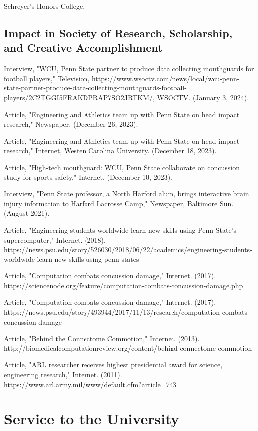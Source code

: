 \documentclass[a4paper,10pt]{article}
\begin{document}
Schreyer's Honors College.
\subsection*{Impact in Society of Research, Scholarship, and Creative Accomplishment}
\noindent
Interview, "WCU, Penn State partner to produce data collecting mouthguards for football players," Television, https://www.wsoctv.com/news/local/wcu-penn-state-partner-produce-data-collecting-mouthguards-football-players/2C2TGGI5FRAKDPRAP7SO2JRTKM/, WSOCTV. (January 3, 2024).

Article, "Engineering and Athletics team up with Penn State on head impact research," Newspaper. (December 26, 2023).

Article, "Engineering and Athletics team up with Penn State on head impact research," Internet, Westen Carolina University. (December 18, 2023).

Article, "High-tech mouthguard: WCU, Penn State collaborate on concussion study for sports safety," Internet. (December 10, 2023).

Interview, "Penn State professor, a North Harford alum, brings interactive brain injury information to Harford Lacrosse Camp," Newspaper, Baltimore Sun. (August 2021).

Article, "Engineering students worldwide learn new skills using Penn State's supercomputer," Internet. (2018).
https://news.psu.edu/story/526030/2018/06/22/academics/engineering-students-worldwide-learn-new-skills-using-penn-states

Article, "Computation combats concussion damage," Internet. (2017).
https://sciencenode.org/feature/computation-combats-concussion-damage.php

Article, "Computation combats concussion damage," Internet. (2017).
https://news.psu.edu/story/493944/2017/11/13/research/computation-combats-concussion-damage

Article, "Behind the Connectome Commotion," Internet. (2013).
http://biomedicalcomputationreview.org/content/behind-connectome-commotion

Article, "ARL researcher receives highest presidential award for science, engineering research," Internet. (2011).
https://www.arl.army.mil/www/default.cfm?article=743
\vspace{0.5\baselineskip}
\section*{Service to the University}
\end{document}
